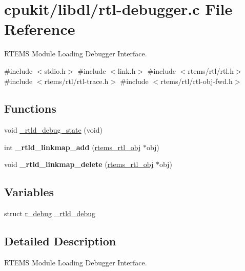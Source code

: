 \hypertarget{rtl-debugger_8c}{}\section{cpukit/libdl/rtl-\/debugger.c File Reference}
\label{rtl-debugger_8c}


R\+T\+E\+MS Module Loading Debugger Interface.  


{\ttfamily \#include $<$stdio.\+h$>$}\newline
{\ttfamily \#include $<$link.\+h$>$}\newline
{\ttfamily \#include $<$rtems/rtl/rtl.\+h$>$}\newline
{\ttfamily \#include $<$rtems/rtl/rtl-\/trace.\+h$>$}\newline
{\ttfamily \#include $<$rtems/rtl/rtl-\/obj-\/fwd.\+h$>$}\newline
\subsection*{Functions}
\begin{DoxyCompactItemize}
\item 
void \mbox{\hyperlink{rtl-debugger_8c_a240e0af85abf0e26f425d668dfc0ef3f}{\+\_\+rtld\+\_\+debug\+\_\+state}} (void)
\item 
\mbox{\label{rtl-debugger_8c_aeee5d06465c235c0ccc2f44f13b32457}} 
int {\bfseries \+\_\+rtld\+\_\+linkmap\+\_\+add} (\mbox{\hyperlink{structrtems__rtl__obj}{rtems\+\_\+rtl\+\_\+obj}} $\ast$obj)
\item 
\mbox{\label{rtl-debugger_8c_a40276ea2c52af7ffe7d86af3e94db4b3}} 
void {\bfseries \+\_\+rtld\+\_\+linkmap\+\_\+delete} (\mbox{\hyperlink{structrtems__rtl__obj}{rtems\+\_\+rtl\+\_\+obj}} $\ast$obj)
\end{DoxyCompactItemize}
\subsection*{Variables}
\begin{DoxyCompactItemize}
\item 
struct \mbox{\hyperlink{structr__debug}{r\+\_\+debug}} \mbox{\hyperlink{rtl-debugger_8c_af51fdd69058427a602e93792bffc74bd}{\+\_\+rtld\+\_\+debug}}
\end{DoxyCompactItemize}


\subsection{Detailed Description}
R\+T\+E\+MS Module Loading Debugger Interface. 

